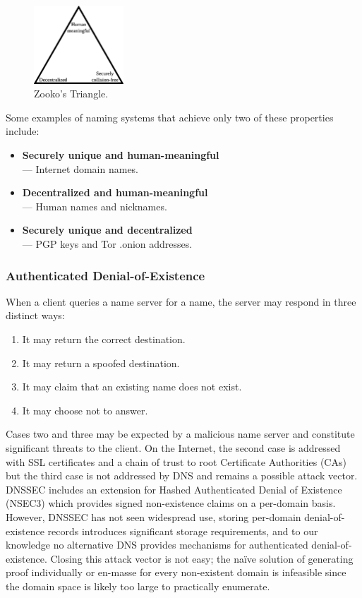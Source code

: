 \documentclass[USenglish,oneside,twocolumn]{article}
\begin{document}
\begin{figure}[htbp]
	\centering
	\includegraphics[width=0.3\textwidth]{../assets/images/Zooko.eps}
	\caption{Zooko's Triangle.}
	\label{fig:ZookosTriangle}
\end{figure}

Some examples of naming systems that achieve only two of these properties include:

\begin{itemize}
	\item \textbf{Securely unique and human-meaningful} \\ --- Internet domain names.
	\item \textbf{Decentralized and human-meaningful} \\ --- Human names and nicknames.
	\item \textbf{Securely unique and decentralized} \\ --- PGP keys and Tor .onion addresses.
\end{itemize}

\subsubsection{Authenticated Denial-of-Existence}
\label{sec:authDenialIntro}

When a client queries a name server for a name, the server may respond in three distinct ways:

\begin{enumerate}
	\item It may return the correct destination.
	\item It may return a spoofed destination.
	\item It may claim that an existing name does not exist.
	\item It may choose not to answer.
\end{enumerate}

Cases two and three may be expected by a malicious name server and constitute significant threats to the client. On the Internet, the second case is addressed with SSL certificates and a chain of trust to root Certificate Authorities (CAs) but the third case is not addressed by DNS and remains a possible attack vector. DNSSEC includes an extension for Hashed Authenticated Denial of Existence (NSEC3) which provides signed non-existence claims on a per-domain basis. However, DNSSEC has not seen widespread use, storing per-domain denial-of-existence records introduces significant storage requirements, and to our knowledge no alternative DNS provides mechanisms for authenticated denial-of-existence. Closing this attack vector is not easy; the na\"{i}ve solution of generating proof individually or en-masse for every non-existent domain is infeasible since the domain space is likely too large to practically enumerate.
\end{document}
